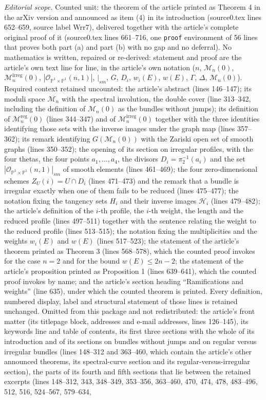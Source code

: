 \documentclass[10pt,a4paper]{amsart}
\theoremstyle{plain}
\theoremstyle{definition}
\theoremstyle{remark}
\DeclareMathOperator{\irreg}{irreg}
\DeclareMathOperator{\reg}{reg}
\begin{document}
\noindent\textit{Editorial scope.} Counted unit: the theorem of the article printed as Theorem 4 in the arXiv version and announced as item (4) in its introduction (source0.tex lines 652--659, source label Wrr7), delivered together with the article's complete original proof of it (source0.tex lines 661--716, one \texttt{proof} environment of 56 lines that proves both part (a) and part (b) with no gap and no deferral). No mathematics is written, repaired or re-derived: statement and proof are the article's own text line for line, in the article's own notation ($n$, $\mathcal M_n(0)$, $\mathcal M_n^{\irreg}(0)$, $|\mathcal O_{\mathbb P^1\times \mathbb P^1}(n,1)|$, $|_{sm}$, $G$, $D_i$, $w_i(E)$, $w(E)$, $\Gamma$, $\Delta$, $\mathcal M_n(0)$). Required context retained uncounted: the article's abstract (lines 146--147); its moduli space $\mathcal M_n$ with the spectral involution, the double cover (line 313--342, including the definition of $\mathcal M_n(0)$ as the bundles without jumps); its definition of $\mathcal M_n^{\reg}(0)$ (lines 344--347) and of $\mathcal M_n^{\irreg}(0)$ together with the three identities identifying those sets with the inverse images under the graph map (lines 357--362); its remark identifying $G(\mathcal M_n(0))$ with the Zariski open set of smooth graphs (lines 350--352); the opening of its section on irregular profiles, with the four thetas, the four points $a_1,\dots,a_4$, the divisors $D_i=\pi_2^{-1}(a_i)$ and the set $|\mathcal O_{\mathbb P^1\times \mathbb P^1}(n,1)|_{sm}$ of smooth elements (lines 461--469); the four zero-dimensional schemes $Z_U(i)=U\cap D_i$ (lines 471--473) and the remark that a bundle is irregular exactly when one of them fails to be reduced (lines 475--477); the notation fixing the tangency sets $H_i$ and their inverse images $\mathcal H_i$ (lines 479--482); the article's definition of the $i$-th profile, the $i$-th weight, the length and the reduced profile (lines 497--511) together with the sentence relating the weight to the reduced profile (lines 513--515); the notation fixing the multiplicities and the weights $w_i(E)$ and $w(E)$ (lines 517--523); the statement of the article's theorem printed as Theorem 3 (lines 568--578), which the counted proof invokes for the case $n=2$ and for the bound $w(E)\le 2n-2$; the statement of the article's proposition printed as Proposition 1 (lines 639--641), which the counted proof invokes by name; and the article's section heading ``Ramifications and weights'' (line 635), under which the counted theorem is printed. Every definition, numbered display, label and structural statement of those lines is retained unchanged. Omitted from this package and not redistributed: the article's front matter (its titlepage block, addresses and e-mail addresses, lines 126--145), its keywords line and table of contents, its first three sections with the whole of its introduction and of its sections on bundles without jumps and on regular versus irregular bundles (lines 148--312 and 363--460, which contain the article's other announced theorems, its spectral-curve section and its regular-versus-irregular section), the parts of its fourth and fifth sections that lie between the retained excerpts (lines 148--312, 343, 348--349, 353--356, 363--460, 470, 474, 478, 483--496, 512, 516, 524--567, 579--634, 
\end{document}
